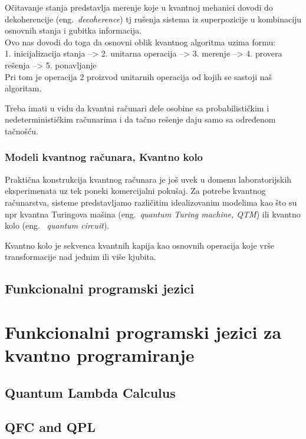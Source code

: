 \documentclass[a4paper]{article}
\begin{document}
{Očitavanje stanja predstavlja merenje koje u kvantnoj mehanici dovodi do dekoherencije (eng.~\emph{decoherence}) tj rušenja sistema iz superpozicije u kombinaciju osnovnih stanja i gubitka informacija.\\

Ovo nas dovodi do toga da osnovni oblik kvantnog algoritma uzima formu:\\

1. inicijalizacija stanja --> 2. unitarna operacija --> 3. merenje --> 4. provera rešenja --> 5. ponavljanje\\

Pri tom je operacija 2 proizvod unitarnih operacija od kojih se sastoji naš algoritam.

Treba imati u vidu da kvantni računari dele osobine sa probabilističkim i nedeterminističkim računarima i da tačno rešenje daju samo sa određenom tačnošću.

\subsubsection{Modeli kvantnog računara, Kvantno kolo}

Praktična konstrukcija kvantnog računara je još uvek u domenu laboratorijskih eksperimenata uz tek poneki komercijalni pokušaj.
Za potrebe kvantnog računarstva, sisteme predstavljamo različitim idealizovanim modelima kao što su npr kvantna Turingova mašina (eng.~\emph{quantum Turing machine, QTM}) ili kvantno kolo (eng. ~\emph{quantum circuit}). 

Kvantno kolo je sekvenca kvantnih kapija kao osnovnih operacija koje vrše transformacije nad jednim ili više kjubita.

\subsection{Funkcionalni programski jezici}
\label{sec:funkcionalniprgjezici}

\section{Funkcionalni programski jezici za kvantno programiranje}
\label{sec:funcprl_qp}


\subsection{Quantum Lambda Calculus}
\label{sec:lambdacalc}


\subsection{QFC and QPL}
\label{sec:qfc_qml}

}
\end{document}
